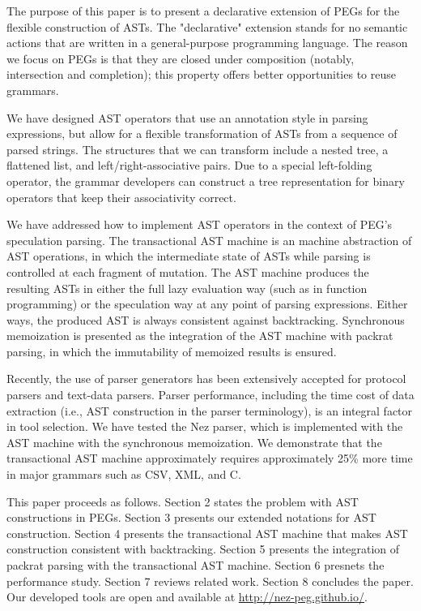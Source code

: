 \documentclass[JIP]{ipsj}
\begin{document}
The purpose of this paper is to present a declarative extension of PEGs for the flexible construction of ASTs. The "declarative" extension stands for no semantic actions that are written in a general-purpose programming language. The reason we focus on PEGs is that they are closed under composition (notably, intersection and completion); this property offers better opportunities to reuse grammars.



We have designed AST operators that use an annotation style in parsing expressions, but allow for a flexible transformation of ASTs from a sequence of parsed strings. The structures that we can transform include a nested tree, a flattened list, and left/right-associative pairs. Due to a special left-folding operator, the grammar developers can construct a tree representation for binary operators that keep their associativity correct.

We have addressed how to implement AST operators in the context of PEG's speculation parsing. The transactional AST machine is an machine abstraction of AST operations, in which the intermediate state of ASTs while parsing is controlled at each fragment of mutation. The AST machine produces the resulting ASTs in either the full lazy evaluation way (such as in function programming) or the speculation way at any point of parsing expressions. Either ways, the produced AST is always consistent against backtracking. Synchronous memoization is presented as the integration of the AST machine with packrat parsing, in which the immutability of memoized results is ensured.



Recently, the use of parser generators has been extensively accepted for protocol parsers and text-data parsers\cite{ICDT11_PADS,OOPSLA14_ParserCombinator}. Parser performance, including the time cost of data extraction (i.e., AST construction in the parser terminology), is an integral factor in tool selection\cite{IMC06_Binpac,WWW06_XMLScreamer}. We have tested the Nez parser, which is implemented with the AST machine with the synchronous memoization. We demonstrate that the transactional AST machine approximately requires approximately 25\% more time in major grammars such as CSV, XML, and C. 

This paper proceeds as follows. 
Section 2 states the problem with AST constructions in PEGs. 
Section 3 presents our extended notations for AST construction. 
Section 4 presents the transactional AST machine that makes AST construction consistent with backtracking. 
Section 5 presents the integration of packrat parsing with the transactional AST machine. 
Section 6 presnets the performance study. 
Section 7 reviews related work. 
Section 8 concludes the paper. Our developed tools are open and available at \url{http://nez-peg.github.io/}.
\end{document}
